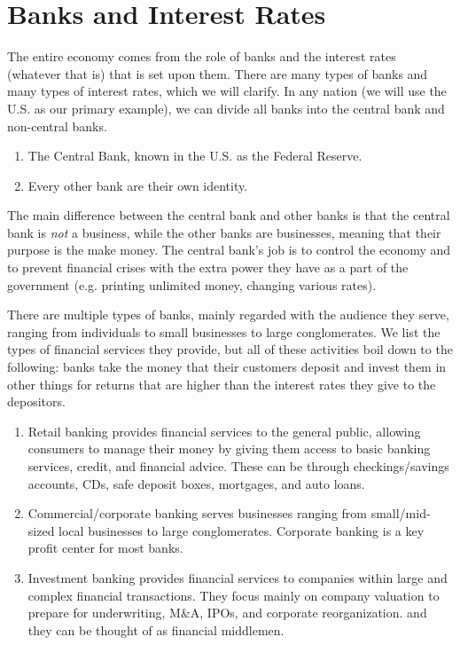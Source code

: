 \documentclass{article}
\begin{document}
\section{Banks and Interest Rates}

  The entire economy comes from the role of banks and the interest rates (whatever that is) that is set upon them. There are many types of banks and many types of interest rates, which we will clarify. In any nation (we will use the U.S. as our primary example), we can divide all banks into the central bank and non-central banks. 
  \begin{enumerate}
    \item The Central Bank, known in the U.S. as the Federal Reserve. 
    \item Every other bank are their own identity. 
  \end{enumerate}
  The main difference between the central bank and other banks is that the central bank is \textit{not} a business, while the other banks are businesses, meaning that their purpose is the make money. The central bank's job is to control the economy and to prevent financial crises with the extra power they have as a part of the government (e.g. printing unlimited money, changing various rates). 

  There are multiple types of banks, mainly regarded with the audience they serve, ranging from individuals to small businesses to large conglomerates. We list the types of financial services they provide, but all of these activities boil down to the following: banks take the money that their customers deposit and invest them in other things for returns that are higher than the interest rates they give to the depositors. 
  \begin{enumerate}
    \item Retail banking provides financial services to the general public, allowing consumers to manage their money by giving them access to basic banking services, credit, and financial advice. These can be through checkings/savings accounts, CDs, safe deposit boxes, mortgages, and auto loans. 
    \item Commercial/corporate banking serves businesses ranging from small/mid-sized local businesses to large conglomerates. Corporate banking is a key profit center for most banks. 
    \item Investment banking provides financial services to companies within large and complex financial transactions. They focus mainly on company valuation to prepare for underwriting, M\&A, IPOs, and corporate reorganization. and they can be thought of as financial middlemen. 
  \end{enumerate}
\end{document}
